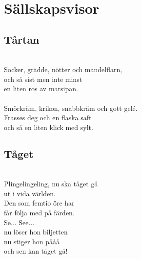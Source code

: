 \chapter{Sällskapsvisor}
\section{Tårtan}
\vspace{2mm}\\
Socker, grädde, nötter och mandelflarn,\\
och så sist men inte minst\\
en liten ros av marsipan.\\
\\
Smörkräm, krikon, snabbkräm och gott gelé.\\
Frasses deg och en flaska saft\\
och så en liten klick med sylt.\\

\section{Tåget}
\vspace{2mm}\\
Plingelingeling, nu ska tåget gå\\
ut i vida världen.\\
Den som femtio öre har\\
får följa med på färden.\\
Se... See...\\
nu löser hon biljetten\\
nu stiger hon pååå\\
och sen kan tåget gå!\\

